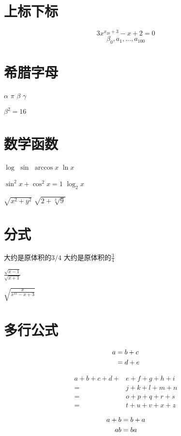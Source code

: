 \documentclass{article}
\begin{document}
    \section{上标下标}
    $$3x^{x_{20} + 3} - x + 2 = 0$$
    $$\beta_0,a_1,...,a_{100}$$

    \section{希腊字母} 
    $\alpha$
    $\pi$
    $\beta$
    $\gamma$

    $\beta^2 = 16$

    \section{数学函数}
    $\log$
    $\sin$
    $\arccos x$
    $\ln x$

    $\sin^2 x+\cos^2 x = 1$
    $\log_2 x$

    $\sqrt{x ^ 2 + y ^ 2}$
    $\sqrt{2 + \sqrt[3]{9}}$ %

    \section{分式}
    大约是原体积的$3/4$
    大约是原体积的$\frac{3}{4}$

    $\frac{\sqrt{x-1}}{\sqrt{x+1}}$

    $\sqrt{\frac{x}{x^{11} - x + 3}}$



    \section{多行公式}
    \begin{align} 
    a & = b + c \notag \\ 
    &=d+e 
    \end{align}
    
    \[
    \begin{aligned}  %
    a+b+c+d+& e+f+g+h+i \\
    =& j+k+l+m+n \\
    =& o+p+q+r+s \\ 
    =& t+u+v+x+z \end{aligned}
    \]

    \begin{gather}
    a+b=b+a \notag \\
    ab = ba    
    \end{gather}
\end{document}
